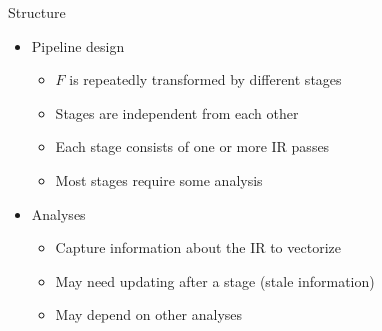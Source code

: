 

\begin{frame}{Structure}

\begin{itemize}
    \item Pipeline design
    \begin{itemize}
        \item $F$ is repeatedly transformed by different stages
        \item Stages are independent from each other
        \item Each stage consists of one or more IR passes
        \item Most stages require some analysis
    \end{itemize}
    \item Analyses
    \begin{itemize}
        \item Capture information about the IR to vectorize
        \item May need updating after a stage (stale information)
        \item May depend on other analyses
    \end{itemize}
\end{itemize}


\end{frame}


